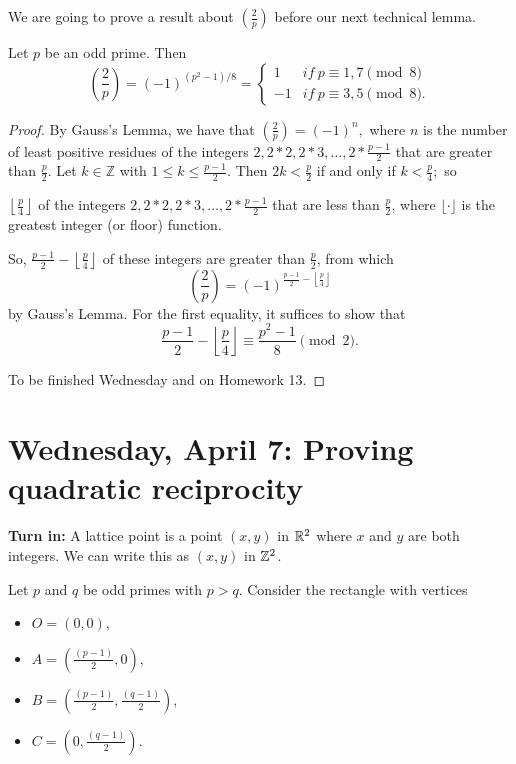 \documentclass[letterpaper, 11 pt]{article}
\begin{document}
We are going to prove a result about $\left(\frac{2}{p}\right)$ before our next technical lemma.

\begin{thm}[Corollary 7.10]
 Let $p$ be an odd prime. Then 
\begin{equation*}
 \left(\frac{2}{p}\right)=(-1)^{(p^2-1)/8}=
\begin{cases}
 1& if\ p\equiv 1,7 \pmod 8\\
 -1 & if\ p\equiv 3,5 \pmod 8.
\end{cases}
\end{equation*}
\end{thm}
\begin{proof}
 By Gauss's Lemma, we have that $\left(\frac{2}{p}\right)=(-1)^n,$ where $n$ is the number of least positive residues of the integers $2,2*2,2*3,\dots,2*\frac{p-1}{2}$ that are greater than $\frac{p}{2}$. Let $k\in\mathbb{Z}$ with $1\leq k\leq \frac{p-1}{2}$. Then $2k< {\frac{p}{2}}
 $ if and only  if $k<\frac{p}{4};$ so 
\begin{cb}
$\left\lfloor\frac{p}{4}\right\rfloor$ of the integers $2,2*2,2*3,\dots,2*\frac{p-1}{2}$ that are less than $\frac{p}{2}$, where $\lfloor\cdot\rfloor$ is the greatest integer (or floor) function.   \end{cb}
 
 So, $\frac{p-1}{2}-\left\lfloor\frac{p}{4}\right\rfloor$  of these integers are greater than $\frac{p}{2}$, from which 
 \[\left(\frac{2}{p}\right)=(-1)^{\frac{p-1}{2}-\left\lfloor\frac{p}{4}\right\rfloor}\] by Gauss's Lemma. For the first equality, it suffices to show that 
 \[\frac{p-1}{2}-\left\lfloor\frac{p}{4}\right\rfloor\equiv \frac{p^2-1}{8} \pmod 2.\]
 
 To be finished Wednesday and on Homework 13. \end{proof}
\section{Wednesday, April 7: Proving quadratic reciprocity}

{\bf Turn in:} A lattice point is a point $(x,y)$ in  $\mathbb R^2$ where $x$ and $y$ are both integers. We can write this as $(x,y)$ in $\mathbb Z^2$.

Let $p$ and $q$ be odd primes with $p>q$. Consider the rectangle with vertices 
\begin{itemize}
 \item $O=(0,0),$
 \item $A=(\frac{(p-1)}{2},0),$
 \item $B=(\frac{(p-1)}{2},\frac{(q-1)}{2})$,
 \item $C=(0,\frac{(q-1)}{2}).$
\end{itemize}
\end{document}
